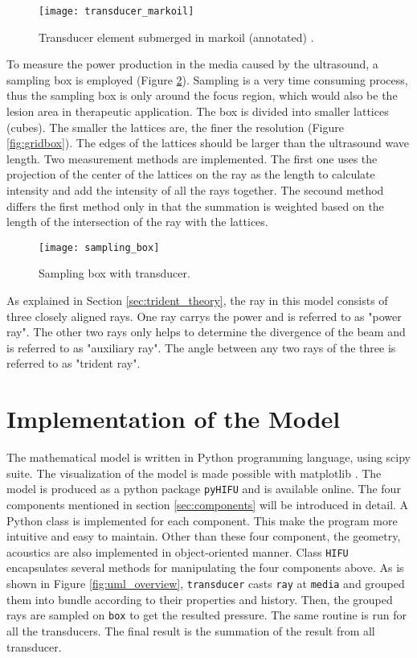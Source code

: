 \begin{figure}[h]
    \centering
    \texttt{[image: transducer\_markoil]}
    \caption{Transducer element submerged in markoil (annotated) \cite{sonavelle} \cite{vanwijk2013}.}
    \label{fig:submerged_transducer}
\end{figure}

To measure the power production in the media caused by the ultrasound, a sampling box is employed (Figure \ref{fig:sampling_box}). Sampling is a very time consuming process, thus the sampling box is only around the focus region, which would also be the lesion area in therapeutic application. The box is divided into smaller lattices (cubes). The smaller the lattices are, the finer the resolution (Figure \ref{fig:gridbox}). The edges of the lattices should be larger than the ultrasound wave length. Two measurement methods are implemented. The first one uses the projection of the center of the lattices on the ray as the length to calculate intensity and add the intensity of all the rays together. The secound method differs the first method only in that the summation is weighted based on the length of the intersection of the ray with the lattices.

\begin{figure}[h]
    \centering
    \texttt{[image: sampling\_box]}
    \caption{Sampling box with transducer.}
    \label{fig:sampling_box}
\end{figure}

As explained in Section \ref{sec:trident_theory}, the ray in this model consists of three closely aligned rays. One ray carrys the power and is referred to as "power ray". The other two rays only helps to determine the divergence of the beam and is referred to as "auxiliary ray". The angle between any two rays of the three is referred to as "trident ray".

\section{Implementation of the Model} \label{sec:implement}
The mathematical model is written in Python programming language, using scipy suite\cite{scipy}. The visualization of the model is made possible with matplotlib \cite{matplotlib}. The model is produced as a python package \texttt{pyHIFU} and is available online. The four components mentioned in section \ref{sec:components} will be introduced in detail. A Python class is implemented for each component. This make the program more intuitive and easy to maintain. Other than these four component, the geometry, acoustics are also implemented in object-oriented manner. Class \texttt{HIFU} encapsulates several methods for manipulating the four components above. As is shown in Figure \ref{fig:uml_overview}, \texttt{transducer} casts \texttt{ray} at \texttt{media} and grouped them into bundle according to their properties and history. Then, the grouped rays are sampled on \texttt{box} to get the resulted pressure. The same routine is run for all the transducers. The final result is the summation of the result from all transducer.

